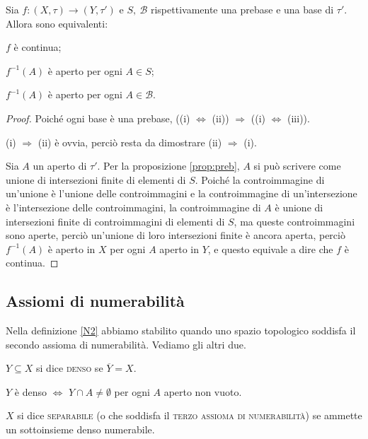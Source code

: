 \documentclass{article}
\begin{document}
\begin{prop}
	Sia $f: (X, \tau) \rightarrow (Y, \tau')$ e $S,\ \mathcal{B}$
	rispettivamente una prebase e una base di $\tau'$. Allora sono equivalenti:
	\begin{nlist}
		\item $f$ è continua;
		\item $f^{-1}(A)$ è aperto per ogni $A \in S$;
		\item $f^{-1}(A)$ è aperto per ogni $A \in \mathcal{B}$.
	\end{nlist}
\end{prop}

\begin{proof}
	Poiché ogni base è una prebase, ((i) $\Leftrightarrow$ (ii)) $\Rightarrow$
	((i) $\Leftrightarrow$ (iii)).

	(i) $\Rightarrow$ (ii) è ovvia, perciò resta da dimostrare (ii)
	$\Rightarrow$ (i).

	Sia $A$ un aperto di $\tau'$. Per la proposizione \ref{prop:preb}, $A$ si
	può scrivere come unione di intersezioni finite di elementi di $S$. Poiché
	la controimmagine di un'unione è l'unione delle controimmagini e la
	controimmagine di un'intersezione è l'intersezione delle controimmagini, la
	controimmagine di $A$ è unione di intersezioni finite di controimmagini di
	elementi di $S$, ma queste controimmagini sono aperte, perciò un'unione di
	loro intersezioni finite è ancora aperta, perciò $f^{-1}(A)$ è aperto in $X$
	per ogni $A$ aperto in $Y$, e questo equivale a dire che $f$ è continua.
\end{proof}

\subsection{Assiomi di numerabilità}

Nella definizione \ref{N2} abbiamo stabilito quando uno spazio topologico
soddisfa il secondo assioma di numerabilità. Vediamo gli altri due.

\begin{defn}
	$Y \subseteq X$ si dice \textsc{denso} se $\overline{Y}=X$.
\end{defn}

\begin{oss}
	$Y$ è denso $\Leftrightarrow$ $Y \cap A \not=\emptyset$ per ogni $A$ aperto
	non vuoto.
\end{oss}

\begin{defn} \label{N3}
	$X$ si dice \textsc{separabile} (o che soddisfa il \textsc{terzo assioma di
	numerabilità}) se ammette un sottoinsieme denso numerabile.
\end{defn}
\end{document}
